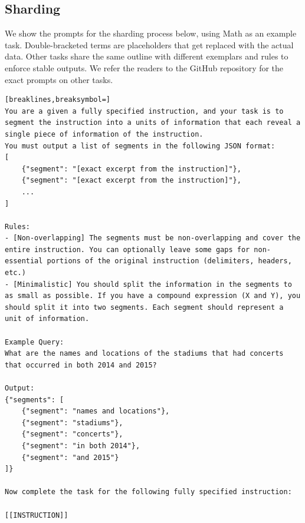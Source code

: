 \subsection{Sharding}\label{sharding_prompt}
We show the prompts for the sharding process below, using Math as an example task. Double-bracketed terms are placeholders that get replaced with the actual data.
Other tasks share the same outline with different exemplars and rules to enforce stable outputs. We refer the readers to the GitHub repository for the exact prompts on other tasks.
\begin{tcolorbox}[title=Segmentation,float, floatplacement=h]
{\footnotesize
\begin{Verbatim}[breaklines,breaksymbol=]
You are a given a fully specified instruction, and your task is to segment the instruction into a units of information that each reveal a single piece of information of the instruction.
You must output a list of segments in the following JSON format:
[
    {"segment": "[exact excerpt from the instruction]"},
    {"segment": "[exact excerpt from the instruction]"},
    ...
]

Rules:
- [Non-overlapping] The segments must be non-overlapping and cover the entire instruction. You can optionally leave some gaps for non-essential portions of the original instruction (delimiters, headers, etc.)
- [Minimalistic] You should split the information in the segments to as small as possible. If you have a compound expression (X and Y), you should split it into two segments. Each segment should represent a unit of information.

Example Query:
What are the names and locations of the stadiums that had concerts that occurred in both 2014 and 2015?

Output:
{"segments": [
    {"segment": "names and locations"},
    {"segment": "stadiums"},
    {"segment": "concerts"},
    {"segment": "in both 2014"},
    {"segment": "and 2015"}
]}

Now complete the task for the following fully specified instruction:

[[INSTRUCTION]]
\end{Verbatim}
}
\end{tcolorbox}

